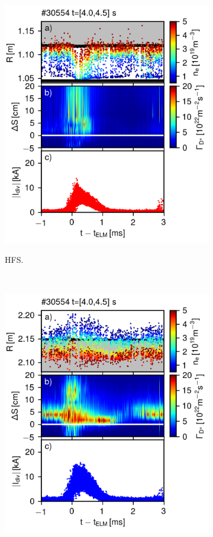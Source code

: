 \documentclass[12pt]{iopart}
\begin{document}
\begin{figure}[!hbt]
\centering
	\begin{subfigure}{3in}
    \includegraphics{ssidiv_30554_4_0_4_5_inin.png}
    \label{fig:elm_30554_HFS_III}
	\caption{HFS.}
	\end{subfigure}
	~
	\begin{subfigure}{3in}
    \includegraphics{ssidiv_30554_4_0_4_5_outout.png}

\end{subfigure}
\end{figure}
\end{document}
